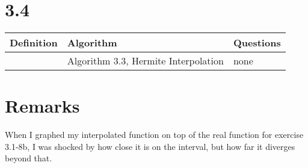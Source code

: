 \documentclass{article}
\begin{document}
\section*{3.4}

\begin{tabularx}{\textwidth}{ |X|X|X| }
    \hline
	{\bf Definition} & {\bf Algorithm} & {\bf Questions} \\
    \hline
	 & Algorithm 3.3, Hermite Interpolation & none \\
    \hline
\end{tabularx}

\section*{Remarks}

When I graphed my interpolated function on top of the real function for exercise 3.1-8b, I was shocked by how close it is on the interval, but how far it diverges beyond that.
\end{document}
